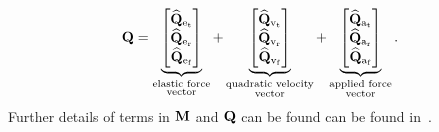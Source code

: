 \begin{equation} \label{Eq03_04: ConstraintsAndForces}
\mathbf{Q} = \underbrace{\begin{bmatrix}
     \mathbf{\widehat{Q}_{\text{e}_{\text{t}}}} \\
     \mathbf{\widehat{Q}_{\text{e}_{\text{r}}}} \\
     \mathbf{\widehat{Q}_{\text{e}_{\text{f}}}} 
\end{bmatrix}}_{\substack{\text{elastic force} \\ \text{vector}}} + \underbrace{\begin{bmatrix}
     \mathbf{\widehat{Q}_{\text{v}_{\text{t}}}} \\
     \mathbf{\widehat{Q}_{\text{v}_{\text{r}}}} \\
     \mathbf{\widehat{Q}_{\text{v}_{\text{f}}}} 
\end{bmatrix}}_{\substack{\text{quadratic velocity} \\ \text{vector}}}+ \underbrace{\begin{bmatrix}
     \mathbf{\widehat{Q}_{\text{a}_{\text{t}}}} \\
     \mathbf{\widehat{Q}_{\text{a}_{\text{r}}}} \\
     \mathbf{\widehat{Q}_{\text{a}_{\text{f}}}} 
\end{bmatrix}}_{\substack{\text{applied force} \\ \text{vector}}}.
\end{equation}
Further details of terms in $\mathbf{M}$ and $\mathbf{Q}$ can be found can be found in~\cite{zwolfer2021nodal}. 

